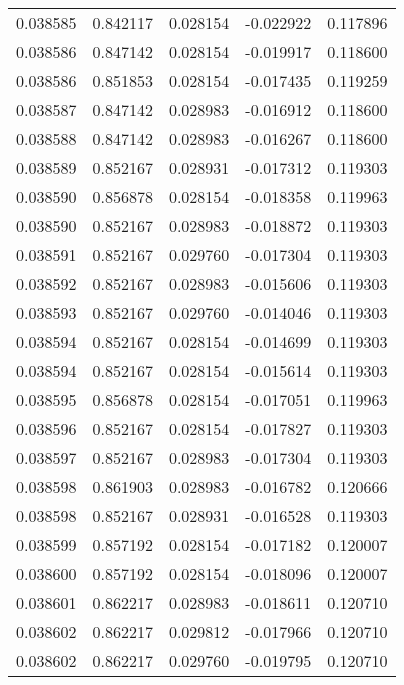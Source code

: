 \begin{tabular}{lrrrr}
0.038585    &  0.842117 &  0.028154 & -0.022922 &             0.117896 \\
0.038586    &  0.847142 &  0.028154 & -0.019917 &             0.118600 \\
0.038586    &  0.851853 &  0.028154 & -0.017435 &             0.119259 \\
0.038587    &  0.847142 &  0.028983 & -0.016912 &             0.118600 \\
0.038588    &  0.847142 &  0.028983 & -0.016267 &             0.118600 \\
0.038589    &  0.852167 &  0.028931 & -0.017312 &             0.119303 \\
0.038590    &  0.856878 &  0.028154 & -0.018358 &             0.119963 \\
0.038590    &  0.852167 &  0.028983 & -0.018872 &             0.119303 \\
0.038591    &  0.852167 &  0.029760 & -0.017304 &             0.119303 \\
0.038592    &  0.852167 &  0.028983 & -0.015606 &             0.119303 \\
0.038593    &  0.852167 &  0.029760 & -0.014046 &             0.119303 \\
0.038594    &  0.852167 &  0.028154 & -0.014699 &             0.119303 \\
0.038594    &  0.852167 &  0.028154 & -0.015614 &             0.119303 \\
0.038595    &  0.856878 &  0.028154 & -0.017051 &             0.119963 \\
0.038596    &  0.852167 &  0.028154 & -0.017827 &             0.119303 \\
0.038597    &  0.852167 &  0.028983 & -0.017304 &             0.119303 \\
0.038598    &  0.861903 &  0.028983 & -0.016782 &             0.120666 \\
0.038598    &  0.852167 &  0.028931 & -0.016528 &             0.119303 \\
0.038599    &  0.857192 &  0.028154 & -0.017182 &             0.120007 \\
0.038600    &  0.857192 &  0.028154 & -0.018096 &             0.120007 \\
0.038601    &  0.862217 &  0.028983 & -0.018611 &             0.120710 \\
0.038602    &  0.862217 &  0.029812 & -0.017966 &             0.120710 \\
0.038602    &  0.862217 &  0.029760 & -0.019795 &             0.120710 \\

\end{tabular}
